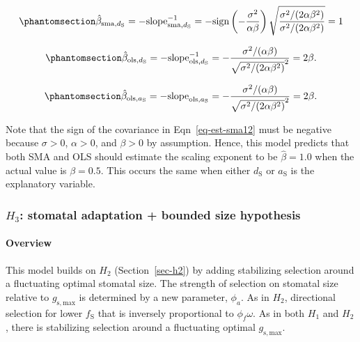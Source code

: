 \documentclass[
  letterpaper,
  DIV=11,
  numbers=noendperiod]{scrartcl}
\let\oldparagraph\paragraph
\renewcommand{\paragraph}[1]{\oldparagraph{#1}\mbox{}}
\begin{document}
\begin{equation}\phantomsection\label{eq-est-sma12}{\hat{\beta}_{\text{sma},d_\mathrm{S}} = -\text{slope}_{\text{sma},d_\mathrm{S}}^{-1} = -\text{sign} \left( -\frac{\sigma ^ 2}{\alpha \beta} \right) \sqrt{\frac{\sigma^2 / (2 \alpha \beta^2)}{\sigma^2 / (2 \alpha \beta^2)}}= 1}\end{equation}

\begin{equation}\phantomsection\label{eq-est-ols12}{\hat{\beta}_{\text{ols},d_\mathrm{S}} = -\text{slope}_{\text{ols},d_\mathrm{S}}^{-1} = -\frac{\sigma^2 / (\alpha \beta)}{\sqrt{\sigma^2 / (2 \alpha \beta^2)} ^ 2} = 2 \beta.}\end{equation}

\begin{equation}\phantomsection\label{eq-est-ols22}{\hat{\beta}_{\text{ols},a_\mathrm{S}} = -\text{slope}_{\text{ols},a_\mathrm{S}} = -\frac{\sigma^2 / (\alpha \beta)}{\sqrt{\sigma^2 / (2 \alpha \beta^2)} ^ 2} = 2 \beta.}\end{equation}

Note that the sign of the covariance in Eqn~\ref{eq-est-sma12} must be
negative because \(\sigma > 0\), \(\alpha > 0\), and \(\beta > 0\) by
assumption. Hence, this model predicts that both SMA and OLS should
estimate the scaling exponent to be \(\hat{\beta} = 1.0\) when the
actual value is \(\beta = 0.5\). This occurs the same when either
\(d_\mathrm{S}\) or \(a_\mathrm{S}\) is the explanatory variable.

\subsubsection{\texorpdfstring{\(H_3\): stomatal adaptation + bounded
size
hypothesis}{H\_3: stomatal adaptation + bounded size hypothesis}}\label{sec-h3}

\paragraph{Overview}\label{overview-2}

This model builds on \(H_2\) (Section~\ref{sec-h2}) by adding
stabilizing selection around a fluctuating optimal stomatal size. The
strength of selection on stomatal size relative to \(g_\mathrm{s,max}\)
is determined by a new parameter, \(\phi_a\). As in \(H_2\), directional
selection for lower \(f_\mathrm{S}\) that is inversely proportional to
\(\phi_f \omega\). As in both \(H_1\) and \(H_2\), there is stabilizing
selection around a fluctuating optimal \(g_\mathrm{s,max}\).
\end{document}
